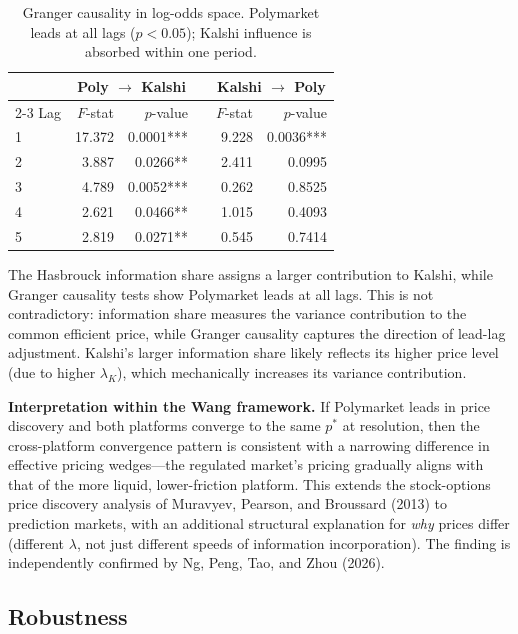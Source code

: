 \documentclass[12pt,a4paper]{article}
\begin{document}
\begin{table}[H]
\centering
\begin{tabular}{lrrlrr}
\toprule
 & \multicolumn{2}{c}{Poly $\to$ Kalshi} & & \multicolumn{2}{c}{Kalshi $\to$ Poly} \\
\cmidrule{2-3} \cmidrule{5-6}
Lag & $F$-stat & $p$-value & & $F$-stat & $p$-value \\
\midrule
1 & 17.372 & 0.0001*** & & 9.228 & 0.0036*** \\
2 & 3.887 & 0.0266** & & 2.411 & 0.0995 \\
3 & 4.789 & 0.0052*** & & 0.262 & 0.8525 \\
4 & 2.621 & 0.0466** & & 1.015 & 0.4093 \\
5 & 2.819 & 0.0271** & & 0.545 & 0.7414 \\
\bottomrule
\end{tabular}
\caption{Granger causality in log-odds space. Polymarket leads at all lags ($p < 0.05$); Kalshi influence is absorbed within one period.}
\label{tab:granger}
\end{table}

The Hasbrouck information share assigns a larger contribution to Kalshi,
while Granger causality tests show Polymarket leads at all lags. This is
not contradictory: information share measures the variance contribution
to the common efficient price, while Granger causality captures the
direction of lead-lag adjustment. Kalshi's larger information share
likely reflects its higher price level (due to higher \(\lambda_K\)),
which mechanically increases its variance contribution.

\textbf{Interpretation within the Wang framework.} If Polymarket leads
in price discovery and both platforms converge to the same \(p^*\) at
resolution, then the cross-platform convergence pattern is consistent
with a narrowing difference in effective pricing wedges---the regulated
market's pricing gradually aligns with that of the more liquid,
lower-friction platform. This extends the stock-options price discovery
analysis of Muravyev, Pearson, and Broussard (2013) to prediction
markets, with an additional structural explanation for \emph{why} prices
differ (different \(\lambda\), not just different speeds of information
incorporation). The finding is independently confirmed by Ng, Peng, Tao,
and Zhou (2026).

\subsection{Robustness}\label{robustness}
\end{document}

